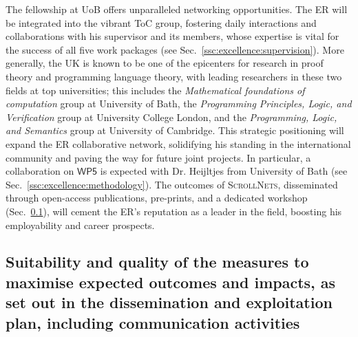 \documentclass[11pt]{msca-pf}
\newcommand{\proj}{\small\textsc{ScrollNets}}
\newcommand{\WP}[1]{$\mathsf{WP#1}$}
\begin{document}
The fellowship at UoB offers unparalleled networking opportunities. The ER will be integrated into
the vibrant ToC group, fostering daily interactions and collaborations with his supervisor and its
members, whose expertise is vital for the success of all five work packages (see
Sec.~\ref{ssc:excellence:supervision}). More generally, the UK is known to be one of the epicenters
for research in proof theory and programming language theory, with leading researchers in these two
fields at top universities; this includes the \emph{Mathematical foundations of computation} group
at University of Bath, the \emph{Programming Principles, Logic, and Verification} group at
University College London, and the \emph{Programming, Logic, and Semantics} group at University of
Cambridge. This strategic positioning will expand the ER collaborative network, solidifying his
standing in the international community and paving the way for future joint projects. In particular,
a collaboration on \WP{5} is expected with Dr. Heijltjes from University of Bath (see
Sec.~\ref{ssc:excellence:methodology}). The outcomes of {\proj}, disseminated through open-access
publications, pre-prints, and a dedicated workshop (Sec.~\ref{ssc:impact:outcomes}), will cement the
ER's reputation as a leader in the field, boosting his employability and career prospects.

\subsection{Suitability and quality of the measures to maximise expected
    outcomes and impacts, as set out in the dissemination and exploitation plan,
    including communication activities }
\label{ssc:impact:outcomes}
\end{document}
